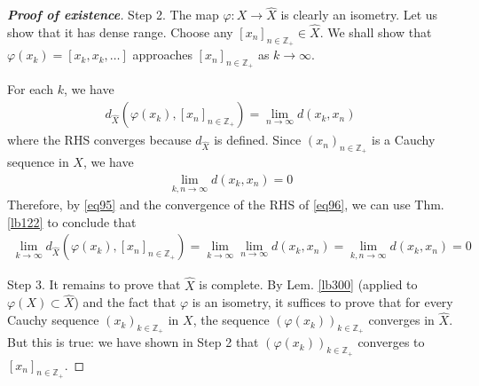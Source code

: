 \documentclass[12pt,b5paper,notitlepage]{article}
\theoremstyle{definition}
\theoremstyle{plain}
\newcommand{\wht}{\widehat}
\newcommand{\Zbb}{\mathbb Z}
\numberwithin{equation}{section}
\begin{document}
\begin{proof}[\textbf{Proof of existence}]
Step 2. The map $\varphi:X\rightarrow\wht X$ is clearly an isometry. Let us show that it has dense range. Choose any $[x_n]_{n\in\Zbb_+}\in\wht X$. We shall show that $\varphi(x_k)=[x_k,x_k,\dots]$ approaches $[x_n]_{n\in\Zbb_+}$ as $k\rightarrow\infty$. 

For each $k$, we have
\begin{align}
d_{\wht X}(\varphi(x_k),[x_n]_{n\in\Zbb_+})=\lim_{n\rightarrow\infty}d(x_k,x_n)\label{eq96}
\end{align}
where the RHS converges because $d_{\wht X}$ is defined. Since $(x_n)_{n\in\Zbb_+}$ is a Cauchy sequence in $X$, we have
\begin{align}
\lim_{k,n\rightarrow\infty} d(x_k,x_n)=0   \label{eq95}
\end{align}
Therefore, by \eqref{eq95} and the convergence of the RHS of \eqref{eq96}, we can use  Thm. \ref{lb122} to conclude that
\begin{align*}
\lim_{k\rightarrow\infty}d_{\wht X}(\varphi(x_k),[x_n]_{n\in\Zbb_+})=\lim_{k\rightarrow\infty}\lim_{n\rightarrow\infty}d(x_k,x_n)=\lim_{k,n\rightarrow\infty}d(x_k,x_n)=0
\end{align*}


Step 3. It remains to prove that $\wht X$ is complete. By Lem. \ref{lb300} (applied to $\varphi(X)\subset\wht X$) and the fact that $\varphi$ is an isometry, it suffices to prove that for every Cauchy sequence $(x_k)_{k\in\Zbb_+}$ in $X$, the sequence $(\varphi(x_k))_{k\in\Zbb_+}$ converges in $\wht X$. But this is true: we have shown in Step 2 that $(\varphi(x_k))_{k\in\Zbb_+}$ converges to $[x_n]_{n\in\Zbb_+}$.
\end{proof}
\end{document}
